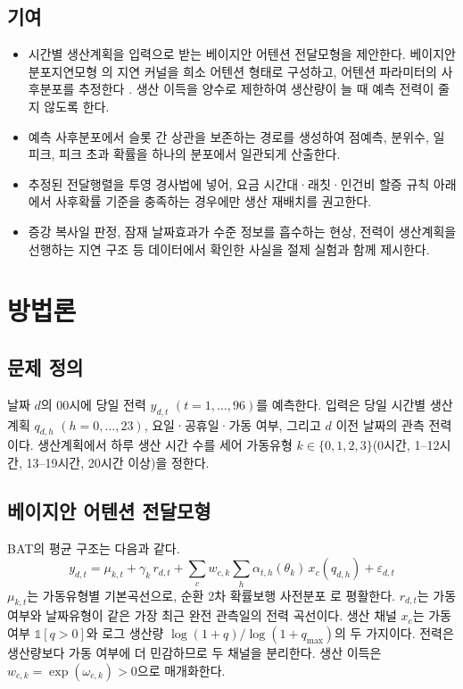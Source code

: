 \subsection{기여}
\begin{itemize}
\item 시간별 생산계획을 입력으로 받는 베이지안 어텐션 전달모형을 제안한다. 베이지안 분포지연모형 \citep{welty2009bdlm}의 지연 커널을 희소 어텐션 \citep{martins2016sparsemax} 형태로 구성하고, 어텐션 파라미터의 사후분포를 추정한다 \citep{fan2020bam}. 생산 이득을 양수로 제한하여 생산량이 늘 때 예측 전력이 줄지 않도록 한다.
\item 예측 사후분포에서 슬롯 간 상관을 보존하는 경로를 생성하여 점예측, 분위수, 일 피크, 피크 초과 확률을 하나의 분포에서 일관되게 산출한다.
\item 추정된 전달행렬을 투영 경사법에 넣어, 요금 시간대·래칫·인건비 할증 규칙 아래에서 사후확률 기준을 충족하는 경우에만 생산 재배치를 권고한다.
\item 증강 복사일 판정, 잠재 날짜효과가 수준 정보를 흡수하는 현상, 전력이 생산계획을 선행하는 지연 구조 등 데이터에서 확인한 사실을 절제 실험과 함께 제시한다.
\end{itemize}

\section{방법론}

\subsection{문제 정의}
날짜 $d$의 00시에 당일 전력 $y_{d,t}$ $(t=1,\dots,96)$를 예측한다. 입력은 당일 시간별 생산계획 $q_{d,h}$ $(h=0,\dots,23)$, 요일·공휴일·가동 여부, 그리고 $d$ 이전 날짜의 관측 전력이다. 생산계획에서 하루 생산 시간 수를 세어 가동유형 $k\in\{0,1,2,3\}$(0시간, 1–12시간, 13–19시간, 20시간 이상)을 정한다.

\subsection{베이지안 어텐션 전달모형}
BAT의 평균 구조는 다음과 같다.
\begin{equation}
y_{d,t} = \mu_{k,t} + \gamma_k\, r_{d,t} + \sum_{c} w_{c,k} \sum_{h} \alpha_{t,h}(\theta_k)\, x_c(q_{d,h}) + \varepsilon_{d,t}
\end{equation}
$\mu_{k,t}$는 가동유형별 기본곡선으로, 순환 2차 확률보행 사전분포 \citep{rue2005gmrf}로 평활한다. $r_{d,t}$는 가동 여부와 날짜유형이 같은 가장 최근 완전 관측일의 전력 곡선이다. 생산 채널 $x_c$는 가동 여부 $\mathbb{1}[q>0]$와 로그 생산량 $\log(1+q)/\log(1+q_{\max})$의 두 가지이다. 전력은 생산량보다 가동 여부에 더 민감하므로 두 채널을 분리한다. 생산 이득은 $w_{c,k}=\exp(\omega_{c,k})>0$으로 매개화한다.

